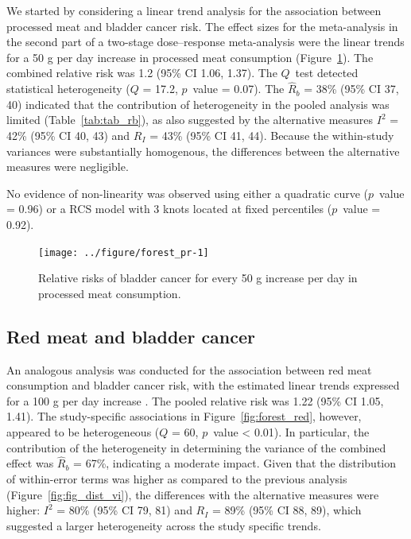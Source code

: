 \documentclass[11pt,a4paper,twoside,openany]{book}\usepackage{knitr}
\begin{document}
{{\noindent We started by considering a linear trend analysis for the association between processed meat and bladder cancer risk. The effect sizes for the meta-analysis in the second part of a two-stage dose--response meta-analysis were the linear trends for a 50 g per day increase in processed meat consumption (Figure~\ref{fig:forest_pr}). The combined relative risk was 1.2 (95\% CI 1.06, 1.37). The $Q$~test detected statistical heterogeneity ($Q $ = 17.2, $p$~value = 0.07). The $\hat R_b$ = 38\% (95\% CI 37, 40) indicated that the contribution of heterogeneity in the pooled analysis was limited (Table~\ref{tab:tab_rb}), as also suggested by the alternative measures $I^2$ = 42\% (95\% CI 40, 43) and $R_I$ = 43\% (95\% CI 41, 44). Because the within-study variances were substantially homogenous, the differences between the alternative measures were negligible. 

\noindent No evidence of non-linearity was observed using either a quadratic curve ($p$~value = 0.96) or a RCS model with 3 knots located at fixed percentiles ($p$~value = 0.92).

\begin{knitrout}\footnotesize
{}\color{fgcolor}\begin{figure}[ht!]

{\centering \texttt{[image: ../figure/forest\_pr-1]} 

}

\caption[Relative risks of bladder cancer for every 50 g increase per day in processed meat consumption]{Relative risks of bladder cancer for every 50 g increase per day in processed meat consumption.}\label{fig:forest_pr}
\end{figure}


\end{knitrout}

\subsection{Red meat and bladder cancer}



An analogous analysis was conducted for the association between red meat consumption and bladder cancer risk, with the estimated linear trends expressed for a 100 g per day increase \citep{crippa2016red}. The pooled relative risk was 1.22 (95\% CI 1.05, 1.41). The study-specific associations in Figure~\ref{fig:forest_red}, however, appeared to be heterogeneous ($Q $ = 60, $p$~value < 0.01). In particular, the contribution of the heterogeneity in determining the variance of the combined effect was $\hat R_b$ = 67\%, indicating a moderate impact. Given that the distribution of within-error terms was higher as compared to the previous analysis (Figure~\ref{fig:fig_dist_vi}), the differences with the alternative measures were higher: $I^2$ = 80\% (95\% CI 79, 81) and $R_I$ = 89\% (95\% CI 88, 89), which suggested a larger heterogeneity across the study specific trends. 

}}
\end{document}
